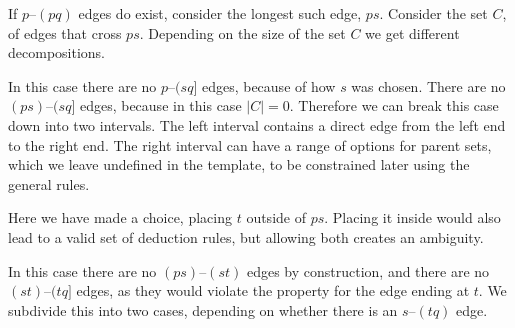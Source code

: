 
If $p$--$(pq)$ edges do exist, consider the longest such edge, $ps$.
Consider the set $C$, of edges that cross $ps$.
Depending on the size of the set $C$ we get different decompositions.

\begin{center}
\end{center}

In this case there are no $p$--$(sq]$ edges, because of how $s$ was chosen.
There are no $(ps)$--$(sq]$ edges, because in this case $|C| = 0$.
Therefore we can break this case down into two intervals.
The left interval contains a direct edge from the left end to the right end.
The right interval can have a range of options for parent sets, which we leave undefined in the template, to be constrained later using the general rules.


\begin{center}
\end{center}

Here we have made a choice, placing $t$ outside of $ps$.
Placing it inside would also lead to a valid set of deduction rules, but allowing both creates an ambiguity.

In this case there are no $(ps)$--$(st)$ edges by construction, and there are no $(st)$--$(tq]$ edges, as they would violate the \oneEC property for the edge ending at $t$.
We subdivide this into two cases, depending on whether there is an $s$--$(tq)$ edge.

